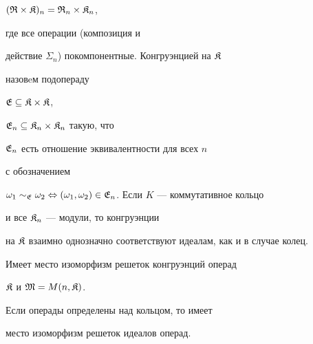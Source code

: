 $(\frak R\times \frak K)_n=\frak R_n\times \frak K_n$,


где все операции (композиция и


действие $\Sigma_n$) покомпонентные. Конгруэнцией на $\frak K$


назовeм подопераду


$\frak E \subseteq \frak K\times\frak K$,


$\frak E_n \subseteq \frak K_n\times\frak K_n$ такую, что


$\frak E_n$ есть отношение эквивалентности для всех $n$


с обозначением


$\omega_1\sim_{\frak E} \omega_2\Leftrightarrow (\omega_1,\omega_2)


\in \frak E_n$. Если $K$ --- коммутативное кольцо 


и все $\frak K_n$ --- модули, то конгруэнции


на $\frak K$ взаимно однозначно соответствуют идеалам, как и в случае колец.





\begin{thm}


Имеет место изоморфизм решеток конгруэнций операд


$\frak K$ и $\frak M=M(n,\frak K)$.


Если операды определены над кольцом, то имеет


место изоморфизм решеток идеалов операд.


\end{thm}





